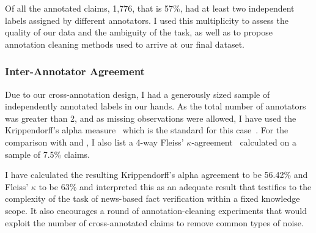 \begin{table}[H]
    \caption{Label distribution in \CTK splits before and after cleaning. Reprinted from~\cite{lrev}}
    \label{tab:ctkfacts}
    \end{table}

Of all the annotated claims, 1,776, that is 57\%, had at least two independent labels assigned by different annotators.
I used this multiplicity to assess the quality of our data and the ambiguity of the task, as well as to propose annotation cleaning methods used to arrive at our final  \CTK dataset.

\subsubsection{Inter-Annotator Agreement}
\label{sec:agreement}

Due to our cross-annotation design, I had a generously sized sample of independently annotated labels in our hands.
As the total number of annotators was greater than 2, and as missing observations were allowed, I have used the Krippendorff's alpha measure~\cite{krippendorff1970} which is the standard for this case~\cite{hayes2007krippendorff}.
For the comparison with \cite{fever} and \cite{norregaard2021danfever}, I also list a 4-way Fleiss' $\kappa$-agreement~\cite{fleiss1971measuring} calculated on a sample of 7.5\% claims.

I have calculated the resulting Krippendorff's alpha agreement to be 56.42\% and Fleiss' $\kappa$ to be 63\% and interpreted this as an adequate result that testifies to the complexity of the task of news-based fact verification within a fixed knowledge scope.
It also encourages a round of annotation-cleaning experiments that would exploit the number of cross-annotated claims to remove common types of noise.

